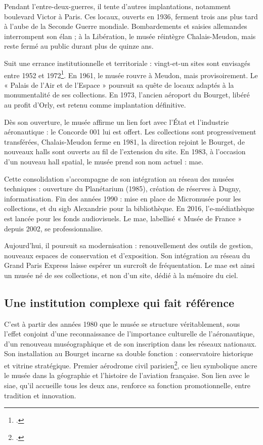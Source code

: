 Pendant l’entre-deux-guerres, il tente d’autres implantations, notamment boulevard Victor à Paris. Ces locaux, ouverts en 1936, ferment trois ans plus tard à l’aube de la Seconde Guerre mondiale. Bombardements et saisies allemandes interrompent son élan ; à la Libération, le musée réintègre Chalais-Meudon, mais reste fermé au public durant plus de quinze ans.

Suit une errance institutionnelle et territoriale : vingt-et-un sites sont envisagés entre 1952 et 1972\footcite{terrierAeroportParisBourget2019}. En 1961, le musée rouvre à Meudon, mais provisoirement. Le « Palais de l’Air et de l’Espace » poursuit sa quête de locaux adaptés à la monumentalité de ses collections. En 1973, l’ancien aéroport du Bourget, libéré au profit d’Orly, est retenu comme implantation définitive.

Dès son ouverture, le musée affirme un lien fort avec l’État et l’industrie aéronautique : le Concorde 001 lui est offert. Les collections sont progressivement transférées, Chalais-Meudon ferme en 1981, la direction rejoint le Bourget, de nouveaux halls sont ouverts au fil de l’extension du site. En 1983, à l’occasion d’un nouveau hall spatial, le musée prend son nom actuel : \acf{mae}.

Cette consolidation s’accompagne de son intégration au réseau des musées techniques : ouverture du Planétarium (1985), création de réserves à Dugny, informatisation. Fin des années 1990 : mise en place de Micromusée pour les collections, et du \ac{sigb} Alexandrie pour la bibliothèque. En 2016, l’e-médiathèque est lancée pour les fonds audiovisuels. Le \ac{mae}, labellisé « Musée de France » depuis 2002, se professionnalise.

Aujourd’hui, il poursuit sa modernisation : renouvellement des outils de gestion, nouveaux espaces de conservation et d’exposition. Son intégration au réseau du Grand Paris Express laisse espérer un surcroît de fréquentation. Le \ac{mae} est ainsi un musée né de ses collections, et non d’un site, dédié à la mémoire du ciel.

\subsection{Une institution complexe qui fait référence}

C’est à partir des années 1980 que le musée se structure véritablement, sous l’effet conjoint d’une reconnaissance de l’importance culturelle de l’aéronautique, d’un renouveau muséographique et de son inscription dans les réseaux nationaux. Son installation au Bourget incarne sa double fonction : conservatoire historique et vitrine stratégique. Premier aérodrome civil parisien\footcite{terrierAeroportParisBourget2019}, ce lieu symbolique ancre le musée dans la géographie et l’histoire de l’aviation française. Son lien avec le \ac{siae}, qu’il accueille tous les deux ans, renforce sa fonction promotionnelle, entre tradition et innovation.

